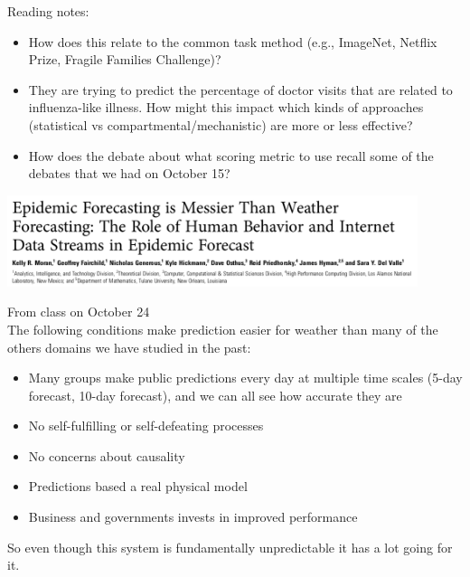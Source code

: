 \documentclass[aspectratio=169]{beamer}
\begin{document}
\begin{frame}

Reading notes:
\begin{itemize}
\item How does this relate to the common task method (e.g., ImageNet, Netflix Prize, Fragile Families Challenge)?
\pause
\item They are trying to predict the percentage of doctor visits that are related to influenza-like illness. How might this impact which kinds of approaches (statistical vs compartmental/mechanistic) are more or less effective?
\pause
\item How does the debate about what scoring metric to use recall some of the debates that we had on October 15?
\end{itemize}

\end{frame}
\begin{frame}

\begin{center}
\includegraphics[width = 0.9\textwidth]{figures/moran_epidemic_2016_title}
\end{center}

\end{frame}
\begin{frame}

From class on October 24\\
The following conditions make prediction easier for weather than many of the others domains we have studied in the past:
\begin{itemize}
\item Many groups make public predictions every day at multiple time scales (5-day forecast, 10-day forecast), and we can all see how accurate they are
\pause
\item No self-fulfilling or self-defeating processes 
\pause
\item No concerns about causality
\pause
\item Predictions based a real physical model
\pause
\item Business and governments invests in improved performance
\end{itemize}

So even though this system is fundamentally unpredictable it has a lot going for it.

\end{frame}
\end{document}
